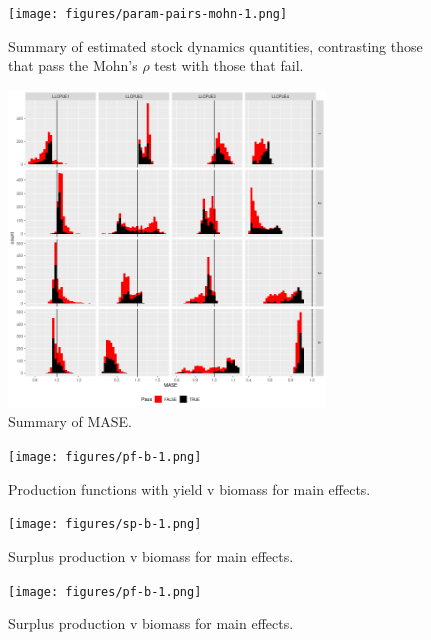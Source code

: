 \begin{figure}[ht!]\centering\texttt{[image: figures/param-pairs-mohn-1.png]} \caption{Summary of estimated stock dynamics quantities, contrasting those that pass the Mohn's $\rho$ test with those that fail.}
\label{fig:param-pairs3-1}       
\end{figure}

\begin{figure}[ht!]\centering\includegraphics[width=0.75\textwidth]{figures/mase-1.png} \caption{Summary of MASE.}
\label{fig:wts}       
\end{figure}

\begin{figure}[ht!]\centering\texttt{[image: figures/pf-b-1.png]} \caption{Production functions with yield v biomass for main effects.}
\label{fig:sp-main}       
\end{figure}

\begin{figure}[ht!]\centering\texttt{[image: figures/sp-b-1.png]} \caption{Surplus production v biomass for main effects.}
\label{fig:sp-main}       
\end{figure}

\begin{figure}[ht!]\centering\texttt{[image: figures/pf-b-1.png]} \caption{Surplus production v biomass  for main effects.}
\label{fig:sp-main}       
\end{figure}
